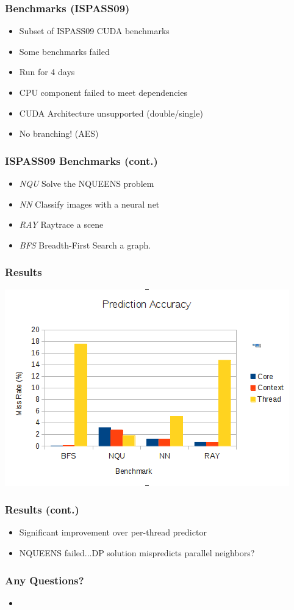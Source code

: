 \documentclass{beamer}
\begin{document}
\begin{frame}
 \frametitle{Benchmarks (ISPASS09)}
 \begin{itemize}
  \item Subset of ISPASS09 CUDA benchmarks
  \item Some benchmarks failed
  \item Run for 4 days
  \item CPU component failed to meet dependencies
  \item CUDA Architecture unsupported (double/single)
  \item No branching!  (AES)
 \end{itemize}
\end{frame}

\begin{frame}
 \frametitle{ISPASS09 Benchmarks (cont.)}
\begin{itemize}
 \item \emph{NQU} Solve the NQUEENS problem
 \item \emph{NN} Classify images with a neural net
  \item \emph{RAY} Raytrace a scene
\item \emph{BFS} Breadth-First Search a graph.
\end{itemize}
\end{frame}

\begin{frame}
\frametitle{Results}
\includegraphics[width=.9\textwidth]{data.png}
\end{frame}

\begin{frame}
 \frametitle{Results (cont.)}
\begin{itemize}
 \item Significant improvement over per-thread predictor
 \item NQUEENS failed...DP solution mispredicts parallel neighbors?
\end{itemize}

\end{frame}

\begin{frame}
 \frametitle{Any Questions?}
\begin{itemize}
 \item 
\end{itemize}

\end{frame}
\end{document}
